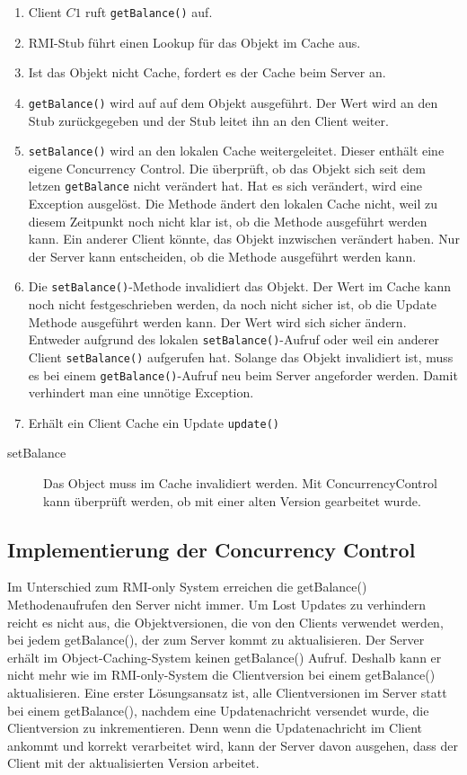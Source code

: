 \begin{enumerate}
\item Client $C1$ ruft \verb+getBalance()+ auf.
\item RMI-Stub führt einen Lookup für das Objekt im Cache aus.
\item Ist das Objekt nicht Cache, fordert es der Cache beim Server an.
\item \verb+getBalance()+ wird auf auf dem Objekt ausgeführt. Der Wert wird an den Stub zurückgegeben und der Stub leitet ihn an den Client weiter.
\item \verb+setBalance()+ wird an den lokalen Cache weitergeleitet. Dieser enthält eine eigene Concurrency Control. Die überprüft, ob das Objekt sich seit dem letzen \verb+getBalance+ nicht verändert hat. Hat es sich verändert, wird eine Exception ausgelöst. Die Methode ändert den lokalen Cache nicht, weil zu diesem Zeitpunkt noch nicht klar ist, ob die Methode ausgeführt werden kann. Ein anderer Client könnte, das Objekt inzwischen verändert haben. Nur der Server kann entscheiden, ob die Methode ausgeführt werden kann.
\item Die \verb+setBalance()+-Methode invalidiert das Objekt. Der Wert im Cache kann noch nicht festgeschrieben werden, da noch nicht sicher ist, ob die Update Methode ausgeführt werden kann. Der Wert wird sich sicher ändern. Entweder aufgrund des lokalen \verb+setBalance()+-Aufruf oder weil ein anderer Client \verb+setBalance()+ aufgerufen hat. Solange das Objekt invalidiert ist, muss es bei einem \verb+getBalance()+-Aufruf neu beim Server angeforder werden. Damit verhindert man eine unnötige Exception.
\item Erhält ein Client Cache ein Update \verb+update()+
\end{enumerate}

\begin{description}
\item [setBalance] Das Object muss im Cache invalidiert werden. Mit ConcurrencyControl kann überprüft werden, ob mit einer alten Version gearbeitet wurde.
\end{description}

\subsection{Implementierung der Concurrency Control}
\label{sec:impl-der-conc}

Im Unterschied zum RMI-only System erreichen die getBalance() Methodenaufrufen den Server nicht immer. Um Lost Updates zu verhindern reicht es nicht aus, die Objektversionen, die von den Clients verwendet werden, bei jedem getBalance(), der zum Server kommt zu aktualisieren. Der Server erhält im Object-Caching-System keinen getBalance() Aufruf. Deshalb kann er nicht mehr wie im RMI-only-System die Clientversion bei einem getBalance() aktualisieren. Eine erster Lösungsansatz ist, alle Clientversionen im Server statt bei einem getBalance(), nachdem eine Updatenachricht versendet wurde, die Clientversion zu inkrementieren. Denn wenn die Updatenachricht im Client ankommt und korrekt verarbeitet wird, kann der Server davon ausgehen, dass der Client mit der aktualisierten Version arbeitet.

